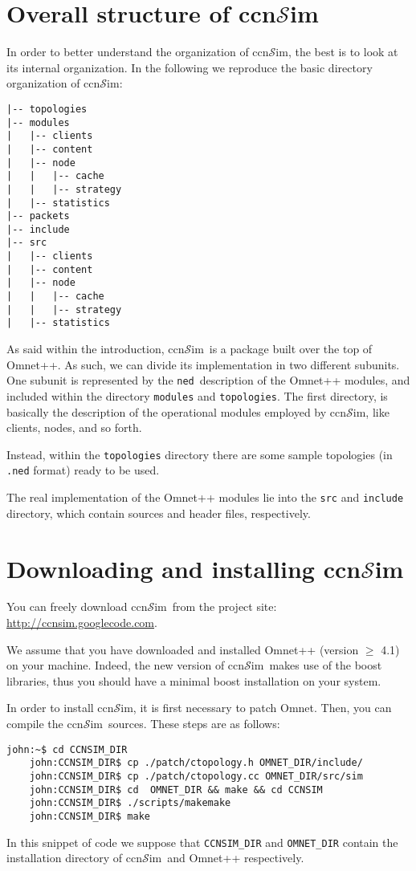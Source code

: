 \documentclass{book}
\newcommand{\ccnsim}{ccn$\mathcal{S}$im}
\newcommand{\ned}{\texttt{ned}}
\begin{document}
\section{Overall structure of \ccnsim}
In order to better understand the organization of \ccnsim, the best is to look at its internal organization. In the following we reproduce the basic directory organization of \ccnsim:
\begin{Verbatim}[frame=single]
|-- topologies
|-- modules
|   |-- clients
|   |-- content
|   |-- node
|   |   |-- cache
|   |   |-- strategy
|   |-- statistics
|-- packets
|-- include
|-- src
|   |-- clients
|   |-- content
|   |-- node
|   |   |-- cache
|   |   |-- strategy
|   |-- statistics
\end{Verbatim}
As said within the introduction, \ccnsim\ is a package built over the top of Omnet++. As such, we can divide its implementation in two different subunits. One subunit is represented by the \ned\ description of the Omnet++ modules, and included within the directory \verb|modules| and \verb|topologies|. The first directory, is basically the description of the operational modules employed by \ccnsim, like clients, nodes, and so forth. 

Instead, within the \verb|topologies| directory there are some sample topologies (in \verb|.ned| format) ready to be used. 

The real implementation of the Omnet++ modules lie into the \verb|src| and \verb|include| directory, which contain sources and header files, respectively.  
\section{Downloading and installing \ccnsim}
You can freely download \ccnsim\ from the project site: \url{http://ccnsim.googlecode.com}. 

We assume that you have downloaded and installed Omnet++ (version $\geq$ 4.1) on your machine. Indeed, the new version of \ccnsim\ makes use of the boost libraries, thus you should have a minimal boost installation on your system. 

In order to install \ccnsim, it is first necessary to patch Omnet. Then, you can compile the \ccnsim\ sources. These steps are as follows:

\begin{Verbatim}[frame=single]
    john:~$ cd CCNSIM_DIR
    john:CCNSIM_DIR$ cp ./patch/ctopology.h OMNET_DIR/include/
    john:CCNSIM_DIR$ cp ./patch/ctopology.cc OMNET_DIR/src/sim
    john:CCNSIM_DIR$ cd  OMNET_DIR && make && cd CCNSIM
    john:CCNSIM_DIR$ ./scripts/makemake
    john:CCNSIM_DIR$ make
\end{Verbatim}
In this snippet of code we suppose that \verb|CCNSIM_DIR| and \verb|OMNET_DIR| contain the installation directory of \ccnsim\ and Omnet++ respectively. 
\end{document}
